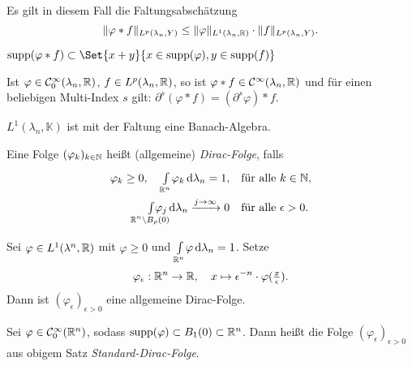 \documentclass{cheat-sheet}
\newcommand{\K}{\mathbb{K}}
\newcommand{\convWith}[1]{\xrightarrow{#1 \to \infty}} %
\begin{document}
\begin{satz}
  Es gilt in diesem Fall die Faltungsabschätzung
  \[ \lVert\varphi * f\rVert_{L^p(\lambda_n, Y)} \leq \lVert\varphi\rVert_{L^1(\lambda_n, \mathbb{R})} \cdot \lVert f\rVert_{L^p(\lambda_n, Y)}. \]
\end{satz}

\begin{satz}
  $\supp (\varphi * f) \subset \Set{x + y}{x \in \supp(\varphi), y \in \supp(f)}$
\end{satz}

\begin{lem}
  Ist $\varphi \in \mathcal{C}_0^\infty(\lambda_n, \mathbb{R})$, $f \in L^p(\lambda_n, \mathbb{R})$, so ist $\varphi * f \in \mathcal{C}^\infty(\lambda_n, \mathbb{R})$ und für einen beliebigen Multi-Index $s$ gilt: $\partial^s (\varphi * f) = (\partial^s \varphi) * f$.
\end{lem}


\begin{bem}
  $L^1(\lambda_n, \K)$ ist mit der Faltung eine Banach-Algebra.
\end{bem}

\begin{defn}
  Eine Folge $(\varphi_k)_{k \in \mathbb{N}}$ heißt (allgemeine) \emph{Dirac-Folge}, falls
  \begin{align*}
    \varphi_k \geq 0, \quad \Int{\R^n}{}{\varphi_k}{\lambda_n} = 1, \quad &\text{für alle $k \in \N$,}\\
    \Int{\mathclap{\R^n \setminus B_\rho(0)}}{}{\varphi_j}{\lambda_n} \convWith{j} 0 \quad &\text{für alle $\epsilon > 0$.}
  \end{align*}
\end{defn}

\begin{satz}
  Sei $\varphi \in L^1(\lambda^n, \mathbb{R})$ mit $\varphi \geq 0$ und ${\textstyle \int\limits_{\mathbb{R}^n}^{}} \varphi \,\mathrm{d} \lambda_n = 1$. Setze
  \[ \varphi_\epsilon : \mathbb{R}^n \to \mathbb{R}, \quad x \mapsto \epsilon^{-n} \cdot \varphi(\tfrac{x}{\epsilon}). \]
  Dann ist $(\varphi_\epsilon)_{\epsilon > 0}$ eine allgemeine Dirac-Folge.
\end{satz}

\begin{defn}
  Sei $\varphi \in \mathcal{C}^\infty_0(\mathbb{R}^n)$, sodass $\mathop{\mathrm{supp}}(\varphi) \subset B_1(0) \subset \mathbb{R}^n$. Dann heißt die Folge $(\varphi_\epsilon)_{\epsilon > 0}$ aus obigem Satz \emph{Standard-Dirac-Folge}.
\end{defn}
\end{document}
